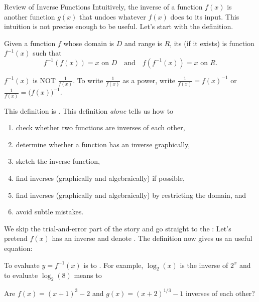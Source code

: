 \documentclass[../main.tex]{subfiles}
\begin{document}
\begin{lesson}{Review of Inverse Functions}
  Intuitively, the inverse of a function \(f(x)\) is another function \(g(x)\) that undoes whatever \(f(x)\) does to its input. This intuition is not precise enough to be useful. Let's start with the definition.

  \begin{mdframed}[style=withref-compact]
    Given a function \(f\) whose domain is \(D\) and range is \(R\), its  (if it exists) is  function \(f^{-1}(x)\) such that
    \[
      f^{-1}(f(x)) = x \text{ on } D \quad\text{and}\quad f(f^{-1}(x)) = x \text{ on } R.
    \]

  \end{mdframed}

  {\faExclamationTriangle{} \(f^{-1}(x)\) is NOT \(\tfrac{1}{f(x)}\). To write \(\tfrac{1}{f(x)}\) as a power, write \(\tfrac{1}{f(x)} = f(x)^{-1}\) or \(\tfrac{1}{f(x)} = \big( f(x) \big)^{-1}\).}
  \bigskip

  This definition is . This definition \emph{alone} tells us how to
  \begin{enumerate}[noitemsep]
    \item check whether two functions are inverses of each other, 
    \item determine whether a function has an inverse graphically, 
    \item sketch the inverse function, 
    \item find inverses (graphically and algebraically) if possible,
    \item find inverses (graphically and algebraically) by restricting the domain, and
    \item avoid subtle mistakes.
  \end{enumerate}

  We skip the trial-and-error part of the story and go straight to the : Let's pretend \(f(x)\) has an inverse and denote \underline{\hspace{2in}}. The definition now gives us an useful equation:

  To evaluate \(y = f^{-1}(x)\) is to \underline{\hspace{4in}}. For example, \(\log_{2}(x)\) is the inverse of \(2^{x}\) and to evaluate \(\log_{2}(8)\) means to 
  \clearpage

  \begin{example}
    Are \(f(x) = (x+1)^{3} - 2\) and \(g(x) = (x+2)^{1/3} - 1\) inverses of each other?
  \end{example}


\end{lesson}
\end{document}
